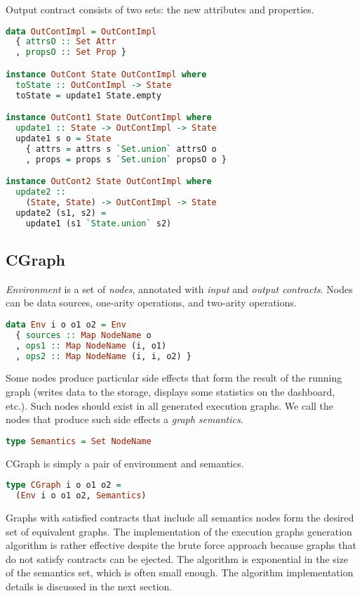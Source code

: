 Output contract consists of two sets: the new attributes and properties.

\begin{lstlisting}[language=Haskell]
data OutContImpl = OutContImpl
  { attrsO :: Set Attr
  , propsO :: Set Prop }

instance OutCont State OutContImpl where
  toState :: OutContImpl -> State
  toState = update1 State.empty

instance OutCont1 State OutContImpl where
  update1 :: State -> OutContImpl -> State
  update1 s o = State
    { attrs = attrs s `Set.union` attrsO o
    , props = props s `Set.union` propsO o }

instance OutCont2 State OutContImpl where
  update2 :: 
    (State, State) -> OutContImpl -> State
  update2 (s1, s2) = 
    update1 (s1 `State.union` s2)
\end{lstlisting}

\subsection{CGraph}

{\em Environment} is a set of {\em nodes}, annotated with {\em input} and {\em output contracts}.
Nodes can be data sources, one-arity operations, and two-arity operations.

\begin{lstlisting}[language=Haskell]
data Env i o o1 o2 = Env
  { sources :: Map NodeName o
  , ops1 :: Map NodeName (i, o1)
  , ops2 :: Map NodeName (i, i, o2) }
\end{lstlisting}

Some nodes produce particular side effects that form the result of the running graph (writes data to the storage, displays some statistics on the dashboard, etc.).
Such nodes should exist in all generated execution graphs.
We call the nodes that produce such side effects a {\em graph semantics}.

\begin{lstlisting}[language=Haskell]
type Semantics = Set NodeName
\end{lstlisting}

CGraph is simply a pair of environment and semantics.

\begin{lstlisting}[language=Haskell]
type CGraph i o o1 o2 = 
  (Env i o o1 o2, Semantics)
\end{lstlisting}

Graphs with satisfied contracts that include all semantics nodes form the desired set of equivalent graphs. 
The implementation of the execution graphs generation algorithm is rather effective despite the brute force approach because graphs that do not satisfy contracts can be ejected. 
The algorithm is exponential in the size of the semantics set, which is often small enough.
The algorithm implementation details is discussed in the next section.
